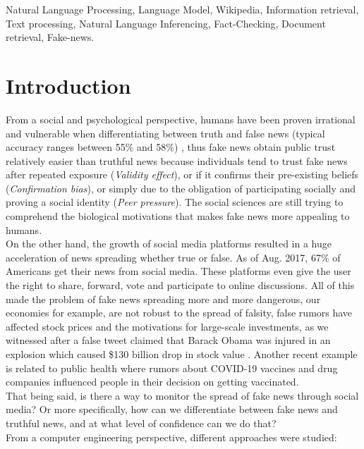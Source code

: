 \documentclass[conference]{IEEEtran}
\begin{document}
\begin{IEEEkeywords}
Natural Language Processing, Language Model, Wikipedia, Information retrieval, Text processing, Natural Language Inferencing, Fact-Checking, Document retrieval, Fake-news.
\end{IEEEkeywords}

\section{Introduction}
From a social and psychological perspective, humans have been proven irrational and vulnerable when differentiating between truth and false news (typical accuracy ranges between 55\% and 58\%) \cite{zhou2019fake}, thus fake news obtain public trust relatively easier than truthful news because individuals tend to trust fake news after repeated exposure (\textit{Validity effect}), or if it confirms their pre-existing beliefs (\textit{Confirmation bias}), or simply due to the obligation of participating socially and proving a social identity (\textit{Peer pressure}). The social sciences are still trying to comprehend the biological motivations that makes fake news more appealing to humans.\\

On the other hand, the growth of social media platforms resulted in a huge acceleration of news spreading whether true or false. As of Aug. 2017, 67\% \cite{zhou2019fake} of Americans get their news from social media. These platforms even give the user the right to share, forward, vote and participate to online discussions. All of this made the problem of fake news spreading more and more dangerous, our economies for example, are not robust to the spread of falsity, false rumors have affected stock prices and the motivations for large-scale investments, as we witnessed after a false tweet claimed that Barack Obama was injured in an explosion which caused \$130 billion drop in stock value \cite{vosoughi2018spread}. Another recent example is related to public health where rumors about COVID-19 vaccines and drug companies influenced people in their decision on getting vaccinated.\\

That being said, is there a way to monitor the spread of fake news through social media? Or more specifically, how can we differentiate between fake news and truthful news, and at what level of confidence can we do that?\\

From a computer engineering perspective, different approaches were studied:
\end{document}

